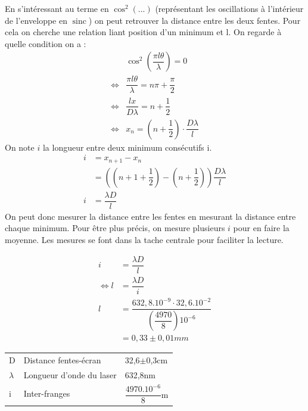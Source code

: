 \documentclass[12pt,a4paper]{article}
\DeclareMathOperator{\sinc}{sinc}
\begin{document}
	
	En s'intéressant au terme en $\cos^2(...)$ (représentant les oscillations à l'intérieur de l'enveloppe en $\sinc$) on peut retrouver la distance entre les deux fentes. Pour cela on cherche une relation liant position d'un minimum et l. On regarde à quelle condition on a :
	\begin{align*}
	&\cos^2\left(\dfrac{\pi l \theta}{\lambda}\right)=0\\
	\iff& \dfrac{\pi l \theta}{\lambda}=n \pi+\dfrac{\pi}{2}\\
	\iff& \dfrac{l x}{D\lambda}=n+\dfrac{1}{2}\\
	\iff& x_n=(n+\dfrac{1}{2})\cdot\dfrac{D\lambda}{l}
	\end{align*}
	On note $i$ la longueur entre deux minimum consécutifs i.
	\begin{align*}
	i&=x_{n+1}-x_{n}\\
	&=((n+1+\dfrac{1}{2})-(n+\dfrac{1}{2}))\dfrac{D\lambda}{l}\\
	i&=\dfrac{\lambda D}{l}
	\end{align*}
	On peut donc mesurer la distance entre les fentes en mesurant la distance entre chaque minimum. Pour être plus précis, on mesure plusieurs $i$ pour en faire la moyenne. Les mesures se font dans la tache centrale pour faciliter la lecture. 
	
	\begin{multicols}{2}
		\noindent
		\begin{align*}
		i&=\dfrac{\lambda D}{l}\\
		\iff l &= \dfrac{\lambda D}{i}\\
		l&=\dfrac{632,8.10^{-9}\cdot 32,6.10^{-2}}{\left(\dfrac{4970}{8}\right)10^{-6}}\\
		&=0,33\pm 0,01mm
		\end{align*}
		\columnbreak
		\vfill
		\begin{tabular}{lll}
			D & Distance fentes-écran & 32,6$\pm$0,3cm\\
			$\lambda$ & Longueur d'onde du laser & 632,8nm\\
			i & Inter-franges & $\dfrac{4970.10^{-6}}{8}$m
		\end{tabular}
	\end{multicols}
\end{document}

